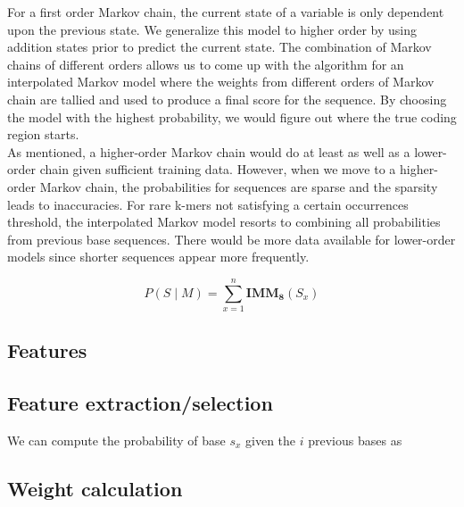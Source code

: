 \documentclass[11pt,letterpaper]{article}
\begin{document}
For a first order Markov chain, the current state of a variable is only dependent upon the previous state. We generalize this model to higher order by using addition states prior to predict the current state. The combination of Markov chains of different orders allows us to come up with the algorithm for an interpolated Markov model where the weights from different orders of Markov chain are tallied and used to produce a final score for the sequence. By choosing the model with the highest probability, we would figure out where the true coding region starts. \\

As mentioned, a higher-order Markov chain would do at least as well as a lower-order chain given sufficient training data. However, when we move to a higher-order Markov chain, the probabilities for sequences are sparse and the sparsity leads to inaccuracies. For rare k-mers not satisfying a certain occurrences threshold, the interpolated Markov model resorts to combining all probabilities from previous base sequences. There would be more data available for lower-order models since shorter sequences appear more frequently.


\begin{equation}
P(S \mid M) = \sum_{x=1}^{n} \mathbf{IMM_8}(S_x)
\end{equation}

\subsection{Features}
\label{ssec:layout}

\subsection{Feature extraction/selection}

We can compute the probability of base $s_x$ given the $i$ previous bases as

\subsection{Weight calculation}
\end{document}
